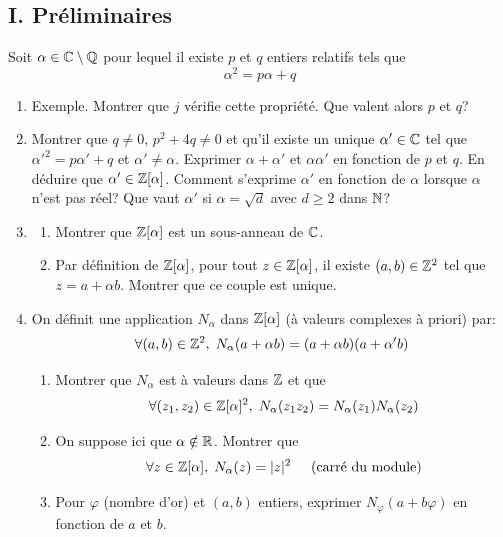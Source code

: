 \subsection*{I. Préliminaires}
Soit $\alpha \in \mathbb{C} \setminus \mathbb{Q}$ pour lequel il existe $p$ et $q$ entiers relatifs tels que 
\begin{displaymath}
  \alpha^2 = p\alpha + q
\end{displaymath}
\begin{enumerate}
  \item Exemple. Montrer que $j$ vérifie cette propriété. Que valent alors $p$ et $q$?
  \item Montrer que $q\neq 0$, $p^2+4q\neq 0$ et qu'il existe un unique $\alpha' \in\mathbb{C}$ tel que $\alpha'^2 = p\alpha' + q$ et $\alpha'\neq \alpha$. Exprimer $\alpha + \alpha'$ et $\alpha \alpha'$ en fonction de $p$ et $q$. En déduire que $\alpha'\in \mathbb{Z}[\alpha]$. Comment s'exprime $\alpha'$ en fonction de $\alpha$ lorsque $\alpha$ n'est pas réel? Que vaut $\alpha'$ si $\alpha = \sqrt{d}$ avec $d\geq 2$ dans $\mathbb{N}$?
  \item 
  \begin{enumerate}
    \item Montrer que $\mathbb{Z}[\alpha]$ est un sous-anneau de $\mathbb{C}$.
    \item Par définition de $\mathbb{Z}[\alpha]$, pour tout $z\in \mathbb{Z}[\alpha]$, il existe $(a,b)\in\mathbb{Z}^2$ tel que $z=a+\alpha b$. Montrer que ce couple est unique.
  \end{enumerate}
  \item On définit une application $N_\alpha$ dans $\mathbb{Z}[\alpha]$ (à valeurs complexes à priori) par:
\begin{displaymath}
  \forall(a,b)\in \mathbb{Z}^2,\; N_{\alpha}(a+\alpha b) = (a+\alpha b)(a+\alpha' b) 
\end{displaymath}
\begin{enumerate}
  \item  Montrer que $N_\alpha$ est à valeurs dans $\mathbb{Z}$ et que 
\begin{displaymath}
  \forall (z_1,z_2)\in \mathbb{Z}[\alpha]^2, \; N_{\alpha}(z_1z_2) = N_{\alpha}(z_1)N_{\alpha}(z_2)
\end{displaymath}
  \item On suppose ici que $\alpha \notin \mathbb{R}$. Montrer que 
\begin{displaymath}
  \forall z\in\mathbb{Z}[\alpha], \; N_\alpha(z) = |z|^2 \hspace{0.5cm} \text{(carré du module)}
\end{displaymath}
  \item Pour $\varphi$ (nombre d'or) et $(a,b)$ entiers, exprimer $N_{\varphi}(a+b\varphi)$ en fonction de $a$ et $b$.
\end{enumerate}
\end{enumerate}

